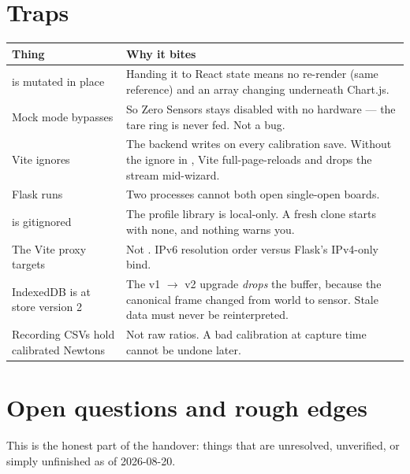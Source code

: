 \documentclass[11pt,a4paper]{article}
\begin{document}
\section{Traps}

\begin{center}
\begin{tabular}{@{}L{5.4cm}L{9.8cm}@{}}
\toprule
\textbf{Thing} & \textbf{Why it bites} \\
\midrule
{} is mutated in place &
  Handing it to React state means no re-render (same reference) and an array
  changing underneath Chart.js. \\
Mock mode bypasses  &
  So \textsf{Zero Sensors} stays disabled with no hardware --- the tare ring is
  never fed. Not a bug. \\
Vite ignores  &
  The backend writes  on every
  calibration save. Without the ignore in ,
  Vite full-page-reloads and drops the stream mid-wizard. \\
Flask runs  &
  Two processes cannot both open single-open boards. \\
 is gitignored &
  The profile library is local-only. A fresh clone starts with none, and nothing
  warns you. \\
The Vite proxy targets  &
  Not . IPv6 resolution order versus Flask's IPv4-only bind. \\
IndexedDB is at store version 2 &
  The v1 $\rightarrow$ v2 upgrade \emph{drops} the buffer, because the canonical
  frame changed from world to sensor. Stale data must never be reinterpreted. \\
Recording CSVs hold calibrated Newtons &
  Not raw ratios. A bad calibration at capture time cannot be undone later. \\
\bottomrule
\end{tabular}
\end{center}

\section{Open questions and rough edges}

This is the honest part of the handover: things that are unresolved, unverified,
or simply unfinished as of 2026-08-20.
\end{document}
